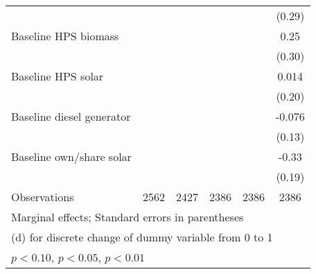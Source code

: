 \begin{table}[htbp]
\begin{tabular*}{1\hsize}{@{\hskip\tabcolsep\extracolsep\fill}l*{5}{c}}
                &                  &                  &                  &                  &   (0.29)         \\
Baseline HPS biomass&                  &                  &                  &                  &     0.25         \\
                &                  &                  &                  &                  &   (0.30)         \\
Baseline HPS solar&                  &                  &                  &                  &    0.014         \\
                &                  &                  &                  &                  &   (0.20)         \\
Baseline diesel generator&                  &                  &                  &                  &   -0.076         \\
                &                  &                  &                  &                  &   (0.13)         \\
Baseline own/share solar&                  &                  &                  &                  &    -0.33\sym{*}  \\
                &                  &                  &                  &                  &   (0.19)         \\
\midrule
Observations    &     2562         &     2427         &     2386         &     2386         &     2386         \\
\bottomrule
\multicolumn{6}{l}{\footnotesize Marginal effects; Standard errors in parentheses}\\
\multicolumn{6}{l}{\footnotesize  (d) for discrete change of dummy variable from 0 to 1}\\
\multicolumn{6}{l}{\footnotesize \sym{*} \(p<0.10\), \sym{**} \(p<0.05\), \sym{***} \(p<0.01\)}\\
\end{tabular*}
\end{table}
